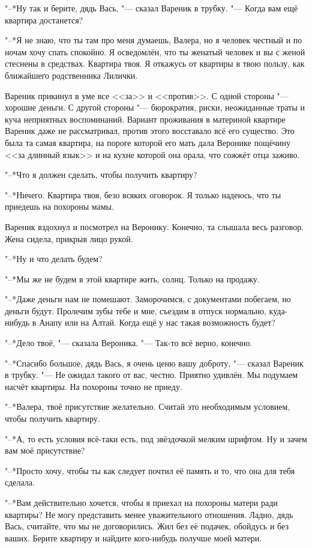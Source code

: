 "--*Ну так и берите, дядь Вась, "--- сказал Вареник в трубку.
"--- Когда вам ещё квартира достанется?

"--*Я не знаю, что ты там про меня думаешь, Валера, но я человек честный и по ночам хочу спать спокойно.
Я осведомлён, что ты женатый человек и вы с женой стеснены в средствах.
Квартира твоя.
Я откажусь от квартиры в твою пользу, как ближайшего родственника Лилички.

Вареник прикинул в уме все <<за>> и <<против>>.
С одной стороны "--- хорошие деньги.
С другой стороны "--- бюрократия, риски, неожиданные траты и куча неприятных воспоминаний.
Вариант проживания в материной квартире Вареник даже не рассматривал, против этого восставало всё его существо.
Это была та самая квартира, на пороге которой его мать дала Веронике пощёчину <<за длинный язык>> и на кухне которой она орала, что сожжёт отца заживо.

"--*Что я должен сделать, чтобы получить квартиру?

"--*Ничего.
Квартира твоя, безо всяких оговорок.
Я только надеюсь, что ты приедешь на похороны мамы.

Вареник вздохнул и посмотрел на Веронику.
Конечно, та слышала весь разговор.
Жена сидела, прикрыв лицо рукой.

"--*Ну и что делать будем?

"--*Мы же не будем в этой квартире жить, солнц.
Только на продажу.

"--*Даже деньги нам не помешают.
Заморочимся, с документами побегаем, но деньги будут.
Пролечим зубы тебе и мне, съездим в отпуск нормально, куда-нибудь в Анапу или на Алтай.
Когда ещё у нас такая возможность будет?

"--*Дело твоё, "--- сказала Вероника.
"--- Так-то всё верно, конечно.

"--*Спасибо большое, дядь Вась, я очень ценю вашу доброту, "--- сказал Вареник в трубку.
"--- Не ожидал такого от вас, честно.
Приятно удивлён.
Мы подумаем насчёт квартиры.
На похороны точно не приеду.

"--*Валера, твоё присутствие желательно.
Считай это необходимым условием, чтобы получить квартиру.

"--*А, то есть условия всё-таки есть, под звёздочкой мелким шрифтом.
Ну и зачем вам моё присутствие?

"--*Просто хочу, чтобы ты как следует почтил её память и то, что она для тебя сделала.

"--*Вам действительно хочется, чтобы я приехал на похороны матери ради квартиры?
Не могу представить менее уважительного отношения.
Ладно, дядь Вась, считайте, что мы не договорились.
Жил без её подачек, обойдусь и без ваших.
Берите квартиру и найдите кого-нибудь получше моей матери.

